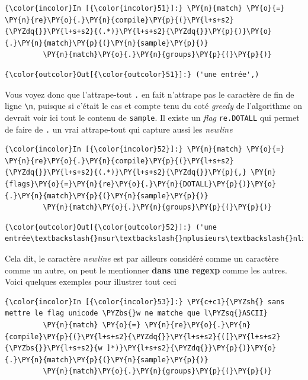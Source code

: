     \begin{Verbatim}[commandchars=\\\{\}]
{\color{incolor}In [{\color{incolor}51}]:} \PY{n}{match} \PY{o}{=} \PY{n}{re}\PY{o}{.}\PY{n}{compile}\PY{p}{(}\PY{l+s+s2}{\PYZdq{}}\PY{l+s+s2}{(.*)}\PY{l+s+s2}{\PYZdq{}}\PY{p}{)}\PY{o}{.}\PY{n}{match}\PY{p}{(}\PY{n}{sample}\PY{p}{)}
         \PY{n}{match}\PY{o}{.}\PY{n}{groups}\PY{p}{(}\PY{p}{)}
\end{Verbatim}


\begin{Verbatim}[commandchars=\\\{\}]
{\color{outcolor}Out[{\color{outcolor}51}]:} ('une entrée',)
\end{Verbatim}
            
    Vous voyez donc que l'attrape-tout
\texttt{\textquotesingle{}.\textquotesingle{}} en fait n'attrape pas le
caractère de fin de ligne \texttt{\textbackslash{}n}, puisque si c'était
le cas et compte tenu du coté \emph{greedy} de l'algorithme on devrait
voir ici tout le contenu de \texttt{sample}. Il existe un \emph{flag}
\texttt{re.DOTALL} qui permet de faire de \texttt{.} un vrai
attrape-tout qui capture aussi les \emph{newline}

    \begin{Verbatim}[commandchars=\\\{\}]
{\color{incolor}In [{\color{incolor}52}]:} \PY{n}{match} \PY{o}{=} \PY{n}{re}\PY{o}{.}\PY{n}{compile}\PY{p}{(}\PY{l+s+s2}{\PYZdq{}}\PY{l+s+s2}{(.*)}\PY{l+s+s2}{\PYZdq{}}\PY{p}{,} \PY{n}{flags}\PY{o}{=}\PY{n}{re}\PY{o}{.}\PY{n}{DOTALL}\PY{p}{)}\PY{o}{.}\PY{n}{match}\PY{p}{(}\PY{n}{sample}\PY{p}{)}
         \PY{n}{match}\PY{o}{.}\PY{n}{groups}\PY{p}{(}\PY{p}{)}
\end{Verbatim}


\begin{Verbatim}[commandchars=\\\{\}]
{\color{outcolor}Out[{\color{outcolor}52}]:} ('une entrée\textbackslash{}nsur\textbackslash{}nplusieurs\textbackslash{}nlignes\textbackslash{}n',)
\end{Verbatim}
            
    Cela dit, le caractère \emph{newline} est par ailleurs considéré comme
un caractère comme un autre, on peut le mentionner \textbf{dans une
regexp} comme les autres. Voici quelques exemples pour illustrer tout
ceci

    \begin{Verbatim}[commandchars=\\\{\}]
{\color{incolor}In [{\color{incolor}53}]:} \PY{c+c1}{\PYZsh{} sans mettre le flag unicode \PYZbs{}w ne matche que l\PYZsq{}ASCII}
         \PY{n}{match} \PY{o}{=} \PY{n}{re}\PY{o}{.}\PY{n}{compile}\PY{p}{(}\PY{l+s+s2}{\PYZdq{}}\PY{l+s+s2}{([}\PY{l+s+s2}{\PYZbs{}}\PY{l+s+s2}{w ]*)}\PY{l+s+s2}{\PYZdq{}}\PY{p}{)}\PY{o}{.}\PY{n}{match}\PY{p}{(}\PY{n}{sample}\PY{p}{)}
         \PY{n}{match}\PY{o}{.}\PY{n}{groups}\PY{p}{(}\PY{p}{)}
\end{Verbatim}


